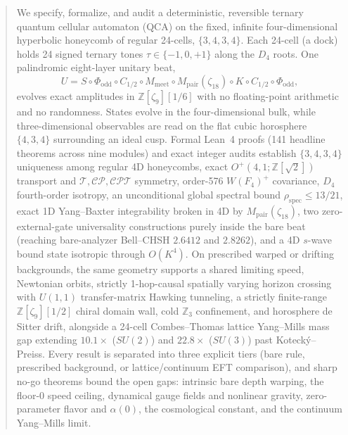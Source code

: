 \begin{abstract}
We specify, formalize, and audit a deterministic, reversible ternary quantum cellular automaton (QCA) on the fixed,
infinite four-dimensional hyperbolic honeycomb of regular 24-cells, $\{3,4,3,4\}$. Each 24-cell (a dock) holds 24
signed ternary tones $\tau \in \{-1, 0, +1\}$ along the $D_4$ roots. One palindromic eight-layer unitary beat,
\[
U = S \circ \Phi_{\mathrm{odd}} \circ C_{1/2} \circ M_{\mathrm{meet}} \circ M_{\mathrm{pair}}(\zeta_{18}) \circ K \circ C_{1/2} \circ \Phi_{\mathrm{odd}},
\]
evolves exact amplitudes in $\mathbb{Z}[\zeta_9][1/6]$ with no floating-point arithmetic and no randomness. States
evolve in the four-dimensional bulk, while three-dimensional observables are read on the flat cubic horosphere
$\{4,3,4\}$ surrounding an ideal cusp. Formal Lean~4 proofs (141 headline theorems across nine modules) and exact
integer audits establish $\{3,4,3,4\}$ uniqueness among regular 4D honeycombs, exact $O^+(4,1; \mathbb{Z}[\sqrt{2}])$
transport and $\mathcal{T}, \mathcal{CP}, \mathcal{CPT}$ symmetry, order-576 $W(F_4)^+$ covariance, $D_4$ fourth-order
isotropy, an unconditional global spectral bound $\rho_{\mathrm{spec}} \le 13/21$, exact 1D Yang--Baxter integrability
broken in 4D by $M_{\mathrm{pair}}(\zeta_{18})$, two zero-external-gate universality constructions purely inside the
bare beat (reaching bare-analyzer Bell--CHSH $2.6412$ and $2.8262$), and a 4D $s$-wave bound state isotropic through
$O(K^4)$. On prescribed warped or drifting backgrounds, the same geometry supports a shared limiting speed, Newtonian
orbits, strictly 1-hop-causal spatially varying horizon crossing with $U(1,1)$ transfer-matrix Hawking tunneling, a
strictly finite-range $\mathbb{Z}[\zeta_9][1/2]$ chiral domain wall, cold $\mathbb{Z}_3$ confinement, and horosphere de
Sitter drift, alongside a 24-cell Combes--Thomas lattice Yang--Mills mass gap extending $10.1\times$ ($SU(2)$) and
$22.8\times$ ($SU(3)$) past Koteck\'y--Preiss. Every result is separated into three explicit tiers (bare rule,
prescribed background, or lattice/continuum EFT comparison), and sharp no-go theorems bound the open gaps: intrinsic
bare depth warping, the floor-0 speed ceiling, dynamical gauge fields and nonlinear gravity, zero-parameter flavor and
$\alpha(0)$, the cosmological constant, and the continuum Yang--Mills limit.
\end{abstract}
